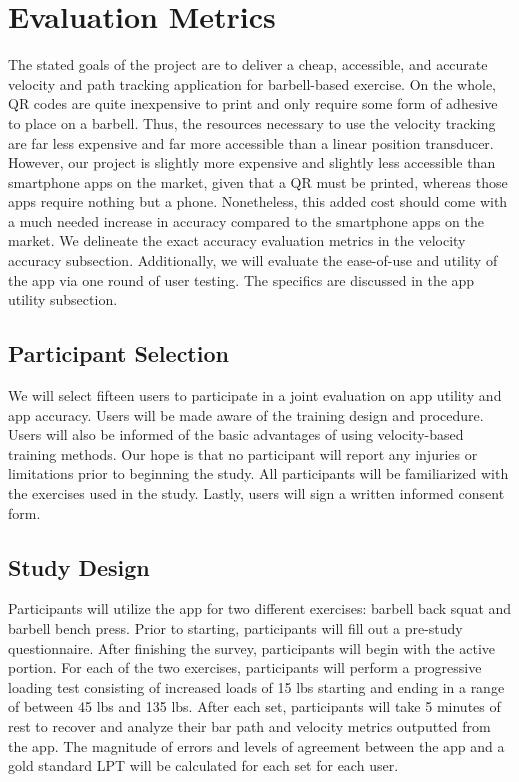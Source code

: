 \documentclass[10pt,twocolumn]{article}
\begin{document}
\section{Evaluation Metrics}
The stated goals of the project are to deliver a cheap, accessible, and accurate velocity and path tracking application for barbell-based exercise.
On the whole, QR codes are quite inexpensive to print and only require some form of adhesive to place on a barbell.
Thus, the resources necessary to use the velocity tracking are far less expensive and far more accessible than a linear position transducer.
However, our project is slightly more expensive and slightly less accessible than smartphone apps on the market, given that a QR must be printed, whereas those apps require nothing but a phone.
Nonetheless, this added cost should come with a much needed increase in accuracy compared to the smartphone apps on the market.
We delineate the exact accuracy evaluation metrics in the velocity accuracy subsection.
Additionally, we will evaluate the ease-of-use and utility of the app via one round of user testing.
The specifics are discussed in the app utility subsection.
\par

\subsection{Participant Selection}
We will select fifteen users to participate in a joint evaluation on app utility and app accuracy.
Users will be made aware of the training design and procedure.
Users will also be informed of the basic advantages of using velocity-based training methods.
Our hope is that no participant will report any injuries or limitations prior to beginning the study.
All participants will be familiarized with the exercises used in the study.
Lastly, users will sign a written informed consent form. \par

\subsection{Study Design}
Participants will utilize the app for two different exercises: barbell back squat and barbell bench press.
Prior to starting, participants will fill out a pre-study questionnaire.
After finishing the survey, participants will begin with the active portion.
For each of the two exercises, participants will perform a progressive loading test consisting of increased loads of 15 lbs starting and ending in a range of between 45 lbs and 135 lbs. 
After each set, participants will take 5 minutes of rest to recover and analyze their bar path and velocity metrics outputted from the app.
The magnitude of errors and levels of agreement between the app and a gold standard LPT will be calculated for each set for each user. \par
\end{document}
